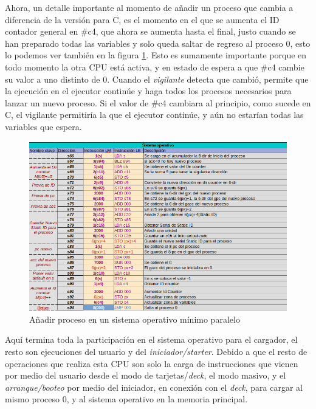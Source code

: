 \documentclass[letterpaper,12pt,oneside]{book}
\begin{document}
			Ahora, un detalle importante al momento de añadir un proceso que cambia a diferencia de la versión para C, es el momento en el que se aumenta el 
			ID contador general en \#c4, que ahora se aumenta hasta el final, justo cuando se han preparado todas las variables y solo queda
			saltar de regreso al proceso 0, esto lo podemos ver también en la figura \ref{fig:somp_add_process}. Esto es sumamente importante porque en todo momento la 
			otra CPU está activa, y en estado de espera
			a que \#c4 cambie su valor a uno distinto de 0. Cuando el \textit{vigilante} detecta que cambió, permite que la ejecución en el
			  ejecutor continúe y haga todos los procesos necesarios para lanzar un nuevo proceso. Si el valor de \#c4 cambiara al principio, como sucede en C, el vigilante permitiría la que el ejecutor continúe, y aún no estarían todas las variables que espera.
			
			
			\begin{figure}[h]		
				\centering
				\includegraphics[scale=0.57]{media/Paralela/somp_add_process.png}
				\caption{ Añadir proceso en un sistema operativo mínimo paralelo}
				\label{fig:somp_add_process}
			\end{figure}	
			
			
			Aquí termina toda la participación en el sistema operativo para el cargador, el resto son ejecuciones del usuario y del \textit{iniciador/starter}. Debido a 
			que el resto de operaciones que realiza esta CPU son solo la carga de instrucciones que vienen por medio del usuario desde el modo de tarjetas/\textit{deck}, el modo 
			masivo, y 
			el \textit{arranque/booteo}  por medio del iniciador, en conexión con el \textit{deck}, para cargar al mismo proceso
			0, y al sistema operativo en la memoria principal.
   
\end{document}
